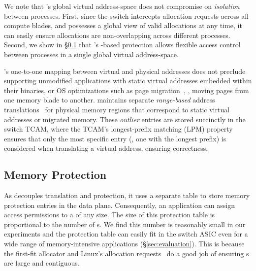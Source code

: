  We note that \mindx's global virtual address-space does not compromise on \textit{isolation} between processes. First, since the switch intercepts allocation requests across all compute blades, and possesses a global view of valid allocations at any time, it can easily ensure allocations are non-overlapping across different processes. Second, we show in \S\ref{subsec:mem_prot} that \mind's -based protection allows flexible access control between processes in a single global virtual address-space.

 \mindx's one-to-one mapping between virtual and physical addresses does not preclude supporting unmodified applications with static virtual addresses embedded within their binaries, or OS optimizations such as page migration~\cite{pagemigrations}, \ie, moving pages from one memory blade to another. \mind maintains separate \textit{range-based} address translations~\cite{rangetranslations} for physical memory regions that correspond to static virtual addresses or migrated memory. These \textit{outlier} entries are stored succinctly in the switch TCAM, where the TCAM's longest-prefix matching (LPM) property ensures that only the most specific entry (\ie, one with the longest prefix) is considered when translating a virtual address, ensuring correctness.

\subsection{Memory Protection}
\label{subsec:mem_prot}

As \mind decouples translation and protection, it uses a separate table to store memory protection entries in the data plane. 
Consequently, an application can assign access permissions to a  of any size.
The size of this protection table is proportional to the number of s. We find this number is reasonably small in our experiments and the protection table can easily fit in the switch ASIC even for a wide range of memory-intensive applications (\S\ref{sec:evaluation}). This is because the first-fit allocator and Linux's  allocation requests~\cite{glibc-alloc} do a good job of ensuring s are large and contiguous. 

